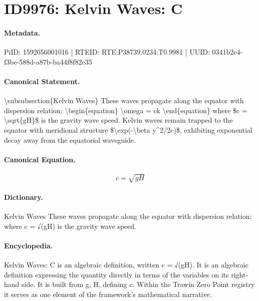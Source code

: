 \section*{ID9976: Kelvin Waves: C}
\paragraph{Metadata.}
PiID: 1592056001016 | RTEID: RTE:P38739.0234:T0.9981 | UUID: 0341b2e4-f3be-588d-a87b-ba44f8f82e35

\paragraph{Canonical Statement.}
\textbackslash{}subsubsection\{Kelvin Waves\} These waves propagate along the equator with dispersion relation: \textbackslash{}begin\{equation\} \textbackslash{}omega = ck \textbackslash{}end\{equation\} where \$c = \textbackslash{}sqrt\{gH\}\$ is the gravity wave speed. Kelvin waves remain trapped to the equator with meridional structure \$\textbackslash{}exp(-\textbackslash{}beta y\textasciicircum{}2/2c)\$, exhibiting exponential decay away from the equatorial waveguide.

\paragraph{Canonical Equation.}
\[
c = \sqrt{gH}
\]

\paragraph{Dictionary.}
Kelvin Waves These waves propagate along the equator with dispersion relation: where c = √(gH) is the gravity wave speed.

\paragraph{Encyclopedia.}
Kelvin Waves: C is an algebraic definition, written c = √(gH). It is an algebraic definition expressing the quantity directly in terms of the variables on its right-hand side. It is built from g, H, defining c. Within the Trawin Zero Point registry it serves as one element of the framework's mathematical narrative.
